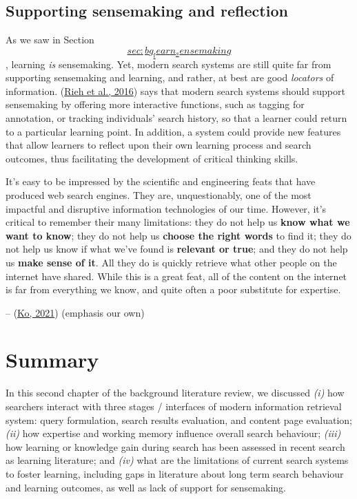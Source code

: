 \documentclass[a4paper, nobind]{templates/ociamthesis}
\begin{document}
\hypertarget{sec:bg_search_sensemaking}{%
\subsection{Supporting sensemaking and reflection}\label{sec:bg_search_sensemaking}}

As we saw in Section
\protect\hyperlink{sec:bg_learn_sensemaking}{\[sec:bg_learn_sensemaking\]}, learning \emph{is} sensemaking. Yet,
modern search systems are still quite far from supporting sensemaking
and learning, and rather, at best are good \emph{locators} of information.
(\protect\hyperlink{ref-rieh2016searching}{Rieh et al., 2016}) says that modern search systems should support
sensemaking by offering more interactive functions, such as tagging for
annotation, or tracking individuals' search history, so that a learner
could return to a particular learning point. In addition, a system could
provide new features that allow learners to reflect upon their own
learning process and search outcomes, thus facilitating the development
of critical thinking skills.

It's easy to be impressed by the scientific and engineering feats that
have produced web search engines. They are, unquestionably, one of the
most impactful and disruptive information technologies of our time.
However, it's critical to remember their many limitations: they do not
help us \textbf{know what we want to know}; they do not help us \textbf{choose the
right words} to find it; they do not help us know if what we've found
is \textbf{relevant or true}; and they do not help us \textbf{make sense of it}.
All they do is quickly retrieve what other people on the internet have
shared. While this is a great feat, all of the content on the internet
is far from everything we know, and quite often a poor substitute for
expertise.

-- (\protect\hyperlink{ref-ko2021seeking}{Ko, 2021}) (emphasis our own)

\hypertarget{sec:bg_search_summary}{%
\section{Summary}\label{sec:bg_search_summary}}

In this second chapter of the background literature review, we discussed
\emph{(i)} how searchers interact with three stages / interfaces of modern
information retrieval system: query formulation, search results
evaluation, and content page evaluation; \emph{(ii)} how expertise and
working memory influence overall search behaviour; \emph{(iii)} how learning
or knowledge gain during search has been assessed in recent search as
learning literature; and \emph{(iv)} what are the limitations of current
search systems to foster learning, including gaps in literature about
long term search behaviour and learning outcomes, as well as lack of
support for sensemaking.
\end{document}
